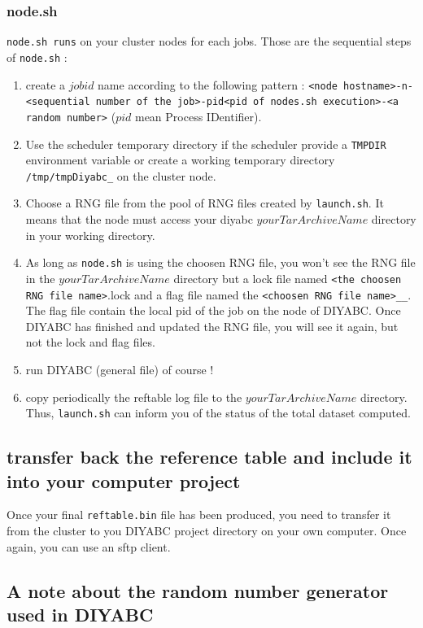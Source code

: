\subsubsection{node.sh}
\texttt{node.sh runs} on your cluster nodes for each jobs. Those are the sequential steps of \texttt{node.sh} :
\begin{enumerate}
    \item create a $job id$ name according to the following pattern : \texttt{<node hostname>-n-<sequential number of the job>-pid<pid of nodes.sh execution>-<a random number>} ($pid$ mean Process IDentifier).
    \item Use the scheduler temporary directory if the scheduler provide a \texttt{TMPDIR} environment variable or create a working temporary directory \texttt{/tmp/tmpDiyabc\_<job id>} on the cluster node.
    \item Choose a RNG file from the pool of RNG files created by \texttt{launch.sh}. It means that the node must access your diyabc $yourTarArchiveName$ directory in your working directory. 
    \item As long as \texttt{node.sh} is using the choosen RNG file, you won't see the RNG file in the $yourTarArchiveName$ directory but a lock file named \texttt{<the choosen RNG file name>}.lock and a flag file named the \texttt{<choosen RNG file name>\_<date of the run>\_<job id>}. The flag file contain the local pid of the job on the node of DIYABC. Once DIYABC has finished and updated the RNG file, you will see it again, but not the lock and flag files.
    \item run DIYABC (general file) of course !
    \item copy periodically the reftable log file to the $yourTarArchiveName$ directory. Thus, \texttt{launch.sh} can inform you of the status of the total dataset computed.
\end{enumerate}



\subsection{transfer back the reference table and include it into your computer project}\label{clusterback}
Once your final \texttt{reftable.bin} file has been produced, you need to transfer it from the cluster to you DIYABC project directory on your own computer. Once again, you can use an sftp client.


\clearpage
\subsection{A note about the random number generator used in DIYABC}\label{rng}



  
